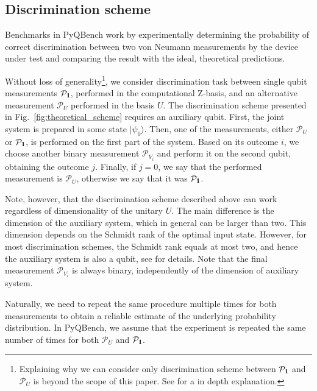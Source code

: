 \documentclass[preprint,12pt, a4paper, dvipsnames]{elsarticle}
\newcommand{\ket}[1]{\ensuremath{|#1\rangle}}
\newcommand{\1}{{\rm 1\hspace{-0.9mm}l}}
\newcommand{\Id}{{\rm 1\hspace{-0.9mm}l}}
\newcommand{\PP}{\mathcal{P}}
\theoremstyle{definition}
\begin{document}
\subsection{Discrimination scheme}\label{sec:discrimination-scheme}

Benchmarks in PyQBench work by experimentally determining the probability of correct discrimination
between two von Neumann measurements by the device under test and comparing the result with the
ideal, theoretical predictions.

Without loss of generality\footnote{Explaining why we can consider only discrimination scheme
between $\PP_{\Id}$ and $\PP_{U}$ is beyond the scope of this paper. See
\cite{puchala2018strategies} for a in depth explanation.}, we consider discrimination task between
single qubit measurements $\PP_\Id$, performed in the computational Z-basis, and an alternative
measurement $\PP_U$ performed in the basis $U$. 
The discrimination scheme presented in Fig.~\ref{fig:theoretical_scheme} requires an
auxiliary qubit. First, the joint system is prepared in some state $\ket{\psi_0}$. Then, one of the
measurements, either $\PP_U$ or $\PP_\1$, is performed on the first part of the system. Based on its
outcome $i$, we choose another binary measurement $\mathcal{P}_{V_i}$ and perform it on the second qubit,
obtaining the outcome $j$. Finally, if $j=0$, we say that the performed measurement is
$\mathcal{P}_U$, otherwise we say that it was $\mathcal{P}_\Id$. 

Note, however, that the discrimination scheme described above can work regardless of dimensionality 
of the unitary $U$. The main difference is the dimension of the auxiliary system, which in general
can be larger than two. This dimension depends on the Schmidt rank of the optimal input state. However, 
for most discrimination schemes, the  Schmidt rank equals at most two, and hence the auxiliary system
is also a qubit, see \cite{puchala2018strategies} for details. Note that the final measurement $\PP_{V_i}$ 
is always binary, independently of the dimension of auxiliary system.

Naturally, we need to repeat the
same procedure multiple times for both measurements to obtain a reliable estimate of the underlying
probability distribution. In PyQBench, we assume that the experiment is repeated the same number of
times for both $\PP_U$ and $\PP_\Id$.
\end{document}
